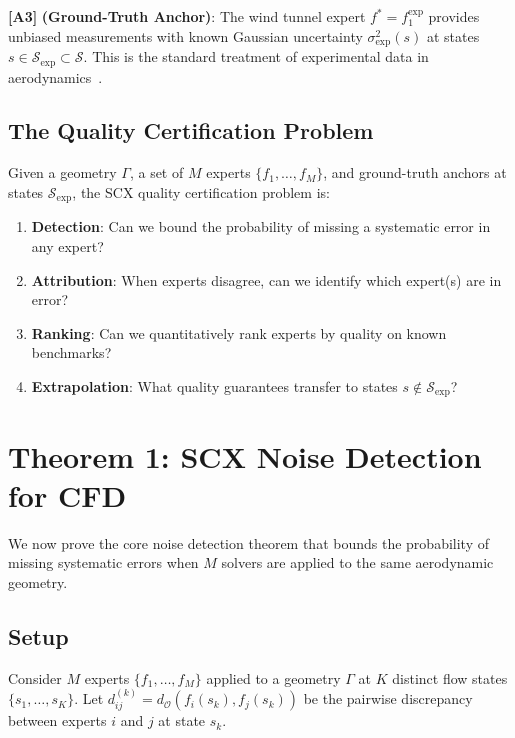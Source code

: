 \documentclass[11pt,a4paper]{article}
\theoremstyle{definition}
\theoremstyle{remark}
\newcommand{\assumptionTag}[1]{\textsf{\textbf{[A#1]}}}
\begin{document}
\assumptionTag{3} \textbf{(Ground-Truth Anchor)}: The wind tunnel expert $f^* = f_1^{\text{exp}}$ provides unbiased measurements with known Gaussian uncertainty $\sigma_{\text{exp}}^2(s)$ at states $s \in \mathcal{S}_{\text{exp}} \subset \mathcal{S}$.
This is the standard treatment of experimental data in aerodynamics~\citep{cooke2009industrial}.

\subsection{The Quality Certification Problem}

Given a geometry $\Gamma$, a set of $M$ experts $\{f_1, \dots, f_M\}$, and ground-truth anchors at states $\mathcal{S}_{\text{exp}}$, the SCX quality certification problem is:

\begin{enumerate}[label=(\roman*)]
    \item \textbf{Detection}: Can we bound the probability of missing a systematic error in any expert?
    \item \textbf{Attribution}: When experts disagree, can we identify which expert(s) are in error?
    \item \textbf{Ranking}: Can we quantitatively rank experts by quality on known benchmarks?
    \item \textbf{Extrapolation}: What quality guarantees transfer to states $s \notin \mathcal{S}_{\text{exp}}$?
\end{enumerate}

\section{Theorem 1: SCX Noise Detection for CFD}

We now prove the core noise detection theorem that bounds the probability of missing systematic errors when $M$ solvers are applied to the same aerodynamic geometry.

\subsection{Setup}

Consider $M$ experts $\{f_1, \dots, f_M\}$ applied to a geometry $\Gamma$ at $K$ distinct flow states $\{s_1, \dots, s_K\}$.
Let $d_{ij}^{(k)} = d_{\mathcal{O}}(f_i(s_k), f_j(s_k))$ be the pairwise discrepancy between experts $i$ and $j$ at state $s_k$.
\end{document}

